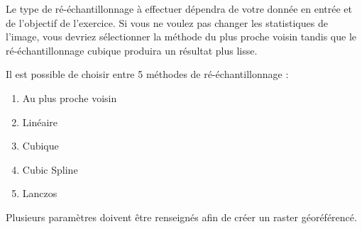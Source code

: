\label{georeferencer_running}

Le type de ré-échantillonnage à effectuer dépendra de votre donnée en entrée et de l'objectif de l'exercice. Si vous ne voulez pas changer les statistiques de l'image, vous devriez sélectionner la méthode du plus proche voisin tandis que le ré-échantillonnage cubique produira un résultat plus lisse.

Il est possible de choisir entre 5 méthodes de ré-échantillonnage :

\begin{enumerate}
\item Au plus proche voisin
\item Linéaire
\item Cubique
\item Cubic Spline
\item Lanczos
\end{enumerate}


Plusieurs paramètres doivent être renseignés afin de créer un raster géoréférencé.

